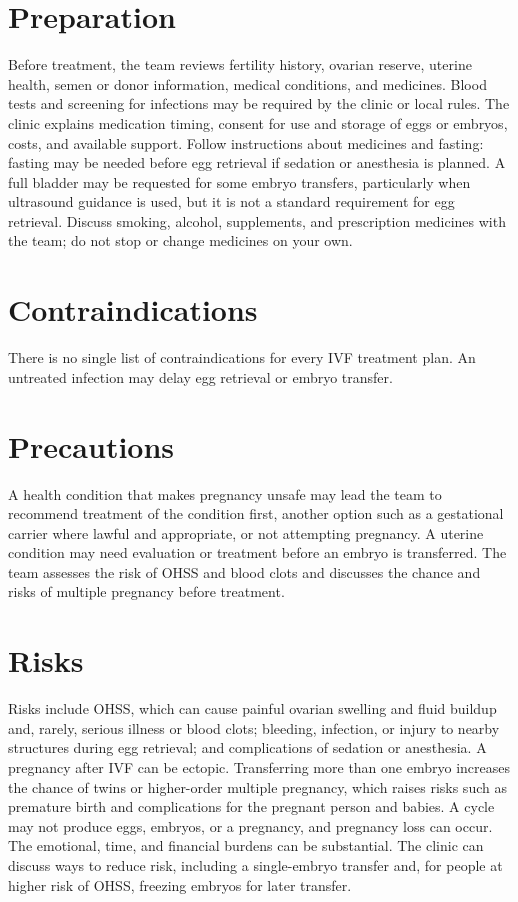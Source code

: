 \section*{Preparation}
Before treatment, the team reviews fertility history, ovarian reserve, uterine health, semen or donor information, medical conditions, and medicines. Blood tests and screening for infections may be required by the clinic or local rules. The clinic explains medication timing, consent for use and storage of eggs or embryos, costs, and available support. Follow instructions about medicines and fasting: fasting may be needed before egg retrieval if sedation or anesthesia is planned. A full bladder may be requested for some embryo transfers, particularly when ultrasound guidance is used, but it is not a standard requirement for egg retrieval. Discuss smoking, alcohol, supplements, and prescription medicines with the team; do not stop or change medicines on your own.

\section*{Contraindications}
There is no single list of contraindications for every IVF treatment plan. An untreated infection may delay egg retrieval or embryo transfer.

\section*{Precautions}
A health condition that makes pregnancy unsafe may lead the team to recommend treatment of the condition first, another option such as a gestational carrier where lawful and appropriate, or not attempting pregnancy. A uterine condition may need evaluation or treatment before an embryo is transferred. The team assesses the risk of OHSS and blood clots and discusses the chance and risks of multiple pregnancy before treatment.

\section*{Risks}
Risks include OHSS, which can cause painful ovarian swelling and fluid buildup and, rarely, serious illness or blood clots; bleeding, infection, or injury to nearby structures during egg retrieval; and complications of sedation or anesthesia. A pregnancy after IVF can be ectopic. Transferring more than one embryo increases the chance of twins or higher-order multiple pregnancy, which raises risks such as premature birth and complications for the pregnant person and babies. A cycle may not produce eggs, embryos, or a pregnancy, and pregnancy loss can occur. The emotional, time, and financial burdens can be substantial. The clinic can discuss ways to reduce risk, including a single-embryo transfer and, for people at higher risk of OHSS, freezing embryos for later transfer.

